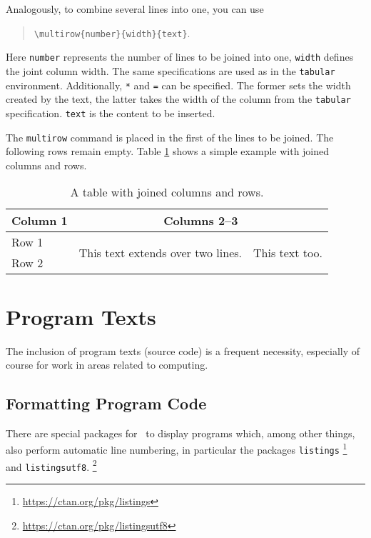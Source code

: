 Analogously, to combine several lines into one, you can use
%
\begin{quote}
    \verb!\multirow{number}{width}{text}!.
\end{quote}
%
Here \texttt{number} represents the number of lines to be joined into one,
\texttt{width} defines the joint column width. The same specifications are
used as in the \texttt{tabular} environment. Additionally, \texttt{*} and
\texttt{=} can be specified. The former sets the width created by the text,
the latter takes the width of the column from the \texttt{tabular}
specification. \texttt{text} is the content to be inserted.

The \verb|multirow| command is placed in the first of the lines to be joined.
The following rows remain empty. Table \ref{tab:multi-column-row-table} shows
a simple example with joined columns and rows.


\begin{table}[htbp]
    \caption{A table with joined columns and rows.}
    \label{tab:multi-column-row-table}
    \centering
    \setlength{\tabcolsep}{10pt} %
    \renewcommand{\arraystretch}{1.25}      %
    \begin{tabular}{@{}lll@{}}
        \toprule
        Column 1 & \multicolumn{2}{c}{Columns 2--3} \\
        \midrule
        Row 1 &
        \multirow{2}{4cm}{This text extends over two lines.} &
        \multirow{2}{*}{This text too.} \\
        Row 2 & & \\
        \bottomrule
    \end{tabular}
\end{table}


\section{Program Texts}
\label{sec:program-texts}

The inclusion of program texts (source code) is a frequent necessity,
especially of course for work in areas related to computing.

\subsection{Formatting Program Code}
\label{sec:FormattingProgramCode}

There are special packages for \latex\ to display programs which, among other
things, also perform automatic line numbering, in particular the packages
\texttt{listings}%
\footnote{\url{https://ctan.org/pkg/listings}}
and \texttt{listingsutf8}.%
\footnote{\url{https://ctan.org/pkg/listingsutf8}}

